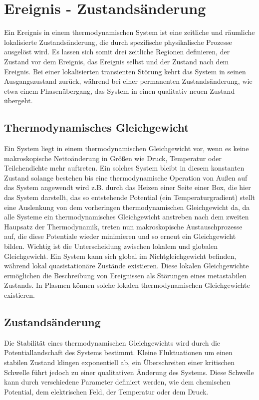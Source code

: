 \section{Ereignis - Zustandsänderung}
\label{sec:theory-event}

Ein Ereignis in einem thermodynamischen System ist eine zeitliche und räumliche lokalisierte Zustandsänderung, die durch spezifische physikalische Prozesse ausgelöst wird. Es lassen sich somit drei zeitliche Regionen definieren, der Zustand vor dem Ereignis, das Ereignis selbst und der Zustand nach dem Ereignis. Bei einer lokalisierten transienten Störung kehrt das System in seinen Ausgangszustand zurück, während bei einer permanenten Zustandsänderung, wie etwa einem Phasenübergang, das System in einen qualitativ neuen Zustand übergeht.

\subsection{Thermodynamisches Gleichgewicht}
Ein System liegt in einem thermodynamischen Gleichgewicht vor, wenn es keine makroskopische Nettoänderung in Größen wie Druck, Temperatur oder Teilchendichte mehr auftreten. Ein solches System bleibt in diesem konstanten Zustand solange bestehen bis eine thermodynamische Operation von Außen auf das System angewendt wird z.B. durch das Heizen einer Seite einer Box, die hier das System darstellt, das so entstehende Potential (ein Temperaturgradient) stellt eine Auslenkung von dem vorheringen thermodynamischen Gleichgewicht da, da alle Systeme ein thermodynamisches Gleichgewicht anstreben nach dem zweiten Haupsatz der Thermodynamik, treten nun makroskopische Austauschprozesse auf, die diese Potentiale wieder minimieren und so erneut ein Gleichgewicht bilden. 
Wichtig ist die Unterscheidung zwischen lokalem und globalen Gleichgewicht. Ein System kann sich global im Nichtgleichgewicht befinden, während lokal quasistationäre Zustände existieren. Diese lokalen Gleichgewichte ermöglichen die Beschreibung von Ereignissen als Störungen eines metastabilen Zustands. In Plasmen können solche lokalen thermodynamischen Gleichgewichte existieren.

\subsection{Zustandsänderung}
Die Stabilität eines thermodynamischen Gleichgewichts wird durch die Potentiallandschaft des Systems bestimmt. Kleine Fluktuationen um einen stabilen Zustand klingen exponentiell ab, ein Überschreiten einer kritischen Schwelle führt jedoch zu einer qualitativen Änderung des Systems. Diese Schwelle kann durch verschiedene Parameter definiert werden, wie dem chemischen Potential, dem elektrischen Feld, der Temperatur oder dem Druck.

